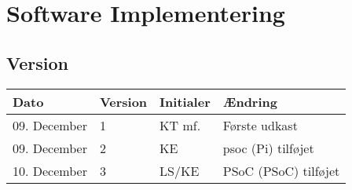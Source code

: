 \chapter{Software Implementering}\label{ch:sw_impl}
\section*{Version}
\begin{table}[h]
	\centering
	\begin{tabularx}{\textwidth - 2cm}{|l|l|l|X|}
	\hline
	Dato			& Version			& Initialer 		& Ændring				\\ \hline
	09. December	& 1 				& KT mf.	 		& Første udkast			\\ \hline
	09. December	& 2 				& KE		 		& psoc (Pi) tilføjet	\\ \hline
	10. December	& 3 				& LS/KE		 		& PSoC (PSoC) tilføjet	\\ \hline
	\end{tabularx}
\end{table}
\clearpage


\clearpage

\clearpage
